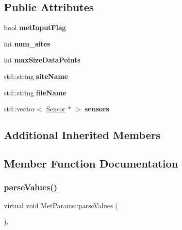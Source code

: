 \subsection*{Public Attributes}
\begin{DoxyCompactItemize}
\item 
\mbox{\label{classMetParams_ac7cbbccae2ef3afa5cdf8c368cca0120}} 
bool {\bfseries met\+Input\+Flag}
\item 
\mbox{\label{classMetParams_a3ee150e743c92d214a1cdc73a8ca0d86}} 
int {\bfseries num\+\_\+sites}
\item 
\mbox{\label{classMetParams_a2837878c4b2d008ceae2ed5238c2c897}} 
int {\bfseries max\+Size\+Data\+Points}
\item 
\mbox{\label{classMetParams_a784eeb51250d096b7a3aa3d103ea1539}} 
std\+::string {\bfseries site\+Name}
\item 
\mbox{\label{classMetParams_ad78ae52fa2be55f705527c308ad1712a}} 
std\+::string {\bfseries file\+Name}
\item 
\mbox{\label{classMetParams_a041964b4d55dc900b92220ff503aaa54}} 
std\+::vector$<$ \hyperlink{classSensor}{Sensor} $\ast$ $>$ {\bfseries sensors}
\end{DoxyCompactItemize}
\subsection*{Additional Inherited Members}


\subsection{Member Function Documentation}
\mbox{\label{classMetParams_ad40706e0668d5e0248f39cc3a480b0af}} 
\subsubsection{\texorpdfstring{parse\+Values()}{parseValues()}}
{\footnotesize\ttfamily virtual void Met\+Params\+::parse\+Values (\begin{DoxyParamCaption}{ }\end{DoxyParamCaption})\hspace{0.3cm}{\ttfamily [inline]}, {\ttfamily [virtual]}}

